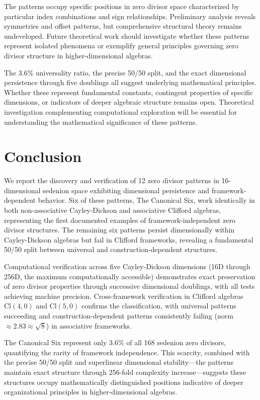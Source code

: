 \documentclass[11pt]{article}
\begin{document}
The patterns occupy specific positions in zero divisor space characterized by particular index combinations and sign relationships. Preliminary analysis reveals symmetries and offset patterns, but comprehensive structural theory remains undeveloped. Future theoretical work should investigate whether these patterns represent isolated phenomena or exemplify general principles governing zero divisor structure in higher-dimensional algebras.

The 3.6\% universality ratio, the precise 50/50 split, and the exact dimensional persistence through five doublings all suggest underlying mathematical principles. Whether these represent fundamental constants, contingent properties of specific dimensions, or indicators of deeper algebraic structure remains open. Theoretical investigation complementing computational exploration will be essential for understanding the mathematical significance of these patterns.

\section{Conclusion}

We report the discovery and verification of 12 zero divisor patterns in 16-dimensional sedenion space exhibiting dimensional persistence and framework-dependent behavior. Six of these patterns, The Canonical Six, work identically in both non-associative Cayley-Dickson and associative Clifford algebras, representing the first documented examples of framework-independent zero divisor structures. The remaining six patterns persist dimensionally within Cayley-Dickson algebras but fail in Clifford frameworks, revealing a fundamental 50/50 split between universal and construction-dependent structures.

Computational verification across five Cayley-Dickson dimensions (16D through 256D, the maximum computationally accessible) demonstrates exact preservation of zero divisor properties through successive dimensional doublings, with all tests achieving machine precision. Cross-framework verification in Clifford algebras $\text{Cl}(4,0)$ and $\text{Cl}(5,0)$ confirms the classification, with universal patterns succeeding and construction-dependent patterns consistently failing (norm $\approx 2.83 \approx \sqrt{8}$) in associative frameworks.

The Canonical Six represent only 3.6\% of all 168 sedenion zero divisors, quantifying the rarity of framework independence. This scarcity, combined with the precise 50/50 split and superlinear dimensional stability---the patterns maintain exact structure through 256-fold complexity increase---suggests these structures occupy mathematically distinguished positions indicative of deeper organizational principles in higher-dimensional algebras.
\end{document}
